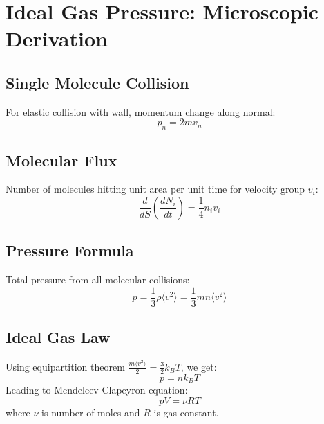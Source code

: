 \documentclass{article}
\begin{document}
\section*{Ideal Gas Pressure: Microscopic Derivation}

\subsection*{Single Molecule Collision}
For elastic collision with wall, momentum change along normal:
\[
p_n = 2mv_n
\]

\subsection*{Molecular Flux}
Number of molecules hitting unit area per unit time for velocity group $v_i$:
\[
\frac{d}{dS}\left(\frac{dN_i}{dt}\right) = \frac{1}{4}n_iv_i
\]

\subsection*{Pressure Formula}
Total pressure from all molecular collisions:
\[
p = \frac{1}{3}\rho\langle v^2\rangle = \frac{1}{3}mn\langle v^2\rangle
\]

\subsection*{Ideal Gas Law}
Using equipartition theorem $\frac{m\langle v^2\rangle}{2}=\frac{3}{2}k_BT$, we get:
\[
p = nk_BT
\]
Leading to Mendeleev-Clapeyron equation:
\[
pV = \nu RT
\]
where $\nu$ is number of moles and $R$ is gas constant.
\end{document}
